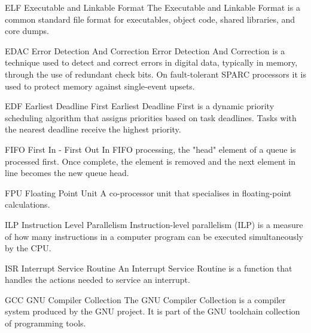 
%
  {ELF}%
  {Executable and Linkable Format}%
  {The Executable and Linkable Format is a common standard file format for
   executables, object code, shared libraries, and core dumps.}%


%
  {EDAC}%
  {Error Detection And Correction}%
  {Error Detection And Correction is a technique used to detect and correct
   errors in digital data, typically in memory, through the use of redundant
   check bits. On fault-tolerant SPARC processors it is used to protect memory
   against single-event upsets.}%

%
  {EDF}%
  {Earliest Deadline First}%
  {Earliest Deadline First is a dynamic priority scheduling algorithm that
   assigns priorities based on task deadlines. Tasks with the nearest
   deadline receive the highest priority.}%

%
  {FIFO}%
  {First In - First Out}%
  {In FIFO processing, the "head" element of a queue is processed first.
   Once complete, the element is removed and the next element in line becomes
   the new queue head.}%


%
  {FPU}%
  {Floating Point Unit}%
  {A co-processor unit that specialises in floating-point calculations.}%

%
  {ILP}%
  {Instruction Level Parallelism}%
  {Instruction-level parallelism (ILP) is a measure of how many instructions in
   a computer program can be executed simultaneously by the \gls{CPU}.}%

%
  {ISR}%
  {Interrupt Service Routine}%
  {An Interrupt Service Routine is a function that handles the actions needed
   to service an interrupt.}%


%
  {GCC}%
  {GNU Compiler Collection}%
  {The GNU Compiler Collection is a compiler system produced by the
   GNU project. It is part of the GNU toolchain collection of programming
   tools.}%

